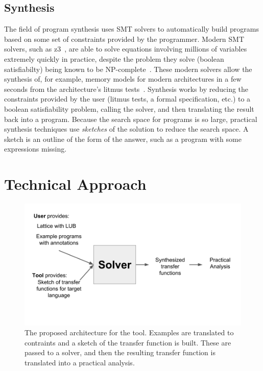 \documentclass[10pt,conference]{IEEEtran}
\begin{document}
\subsection{Synthesis}

The field of program synthesis uses SMT solvers to
automatically build programs based on some set of constraints provided
by the programmer. Modern SMT solvers, such as z3~\cite{z3}, are able
to solve equations involving millions of variables extremely quickly
in practice, despite the problem they solve (boolean satisfiabilty)
being known to be NP-complete~\cite{cook71complexity}. These modern solvers
allow the synthesis of, for example, memory models for modern architectures
in a few seconds from the architecture's litmus tests~\cite{bornholt17}.
Synthesis works by reducing the constraints provided by the user
(litmus tests, a formal specification, etc.) to a boolean satisfiability
problem, calling the solver, and then translating the result back into
a program. Because the search space for programs is so large, practical
synthesis techniques use \textit{sketches} of the solution to reduce
the search space. A sketch is an outline of the form of the answer,
such as a program with some expressions missing.

\section{Technical Approach}

\begin{figure}
 \includegraphics[width=\linewidth]{arch.png}
 \caption{The proposed architecture for the tool.
   Examples are translated to contraints and a sketch of the transfer function is built.
   These are passed to a solver, and then the resulting transfer function is translated into
 a practical analysis.}
\label{fig-arch}
\end{figure} 
\end{document}
